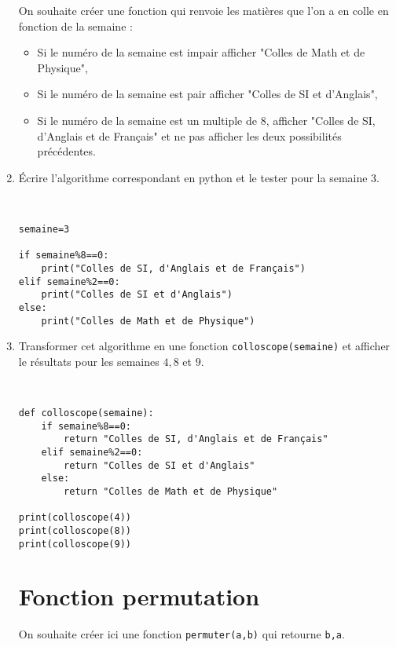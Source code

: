 \begin{enumerate}
On souhaite créer une fonction qui renvoie les matières que l'on a en colle en fonction de la semaine :
\begin{itemize}
\item Si le numéro de la semaine est impair afficher "Colles de Math et de Physique",
\item Si le numéro de la semaine est pair afficher "Colles de SI et d'Anglais",
\item Si le numéro de la semaine est un multiple de 8, afficher "Colles de SI, d'Anglais et de Français" et ne pas afficher les deux possibilités précédentes.
\end{itemize}

 \item Écrire l'algorithme correspondant en python et le tester pour la semaine 3. 

\begin{solution}~\ \\
\begin{verbatim}
semaine=3

if semaine%8==0:
    print("Colles de SI, d'Anglais et de Français")
elif semaine%2==0:
    print("Colles de SI et d'Anglais")
else:
    print("Colles de Math et de Physique")
\end{verbatim}
\end{solution}

 \item Transformer cet algorithme en une fonction \verb?colloscope(semaine)? et afficher le résultats pour les semaines $4,8$ et $9$.

\begin{solution}~\ \\
\begin{verbatim}
def colloscope(semaine):
    if semaine%8==0:
        return "Colles de SI, d'Anglais et de Français"
    elif semaine%2==0:
        return "Colles de SI et d'Anglais"
    else:
        return "Colles de Math et de Physique"

print(colloscope(4))
print(colloscope(8))
print(colloscope(9))
\end{verbatim}
\end{solution}

\section*{Fonction permutation}

On souhaite créer ici une fonction \verb?permuter(a,b)? qui retourne \verb?b,a?.


\end{enumerate}
